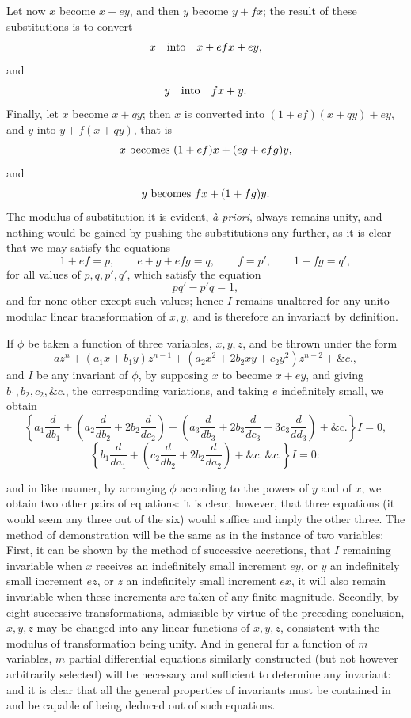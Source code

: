 \documentclass[11pt]{article}
\newcommand{\sourcepage}[1]{\marginpar{\scriptsize p.~#1}}
\begin{document}
{{Let now $x$ become $x+ey$, and then $y$ become $y+fx$; the result of these substitutions is to convert
\[
x\quad\hbox{into}\quad x+efx+ey,
\]
and
\[
y\quad\hbox{into}\quad fx+y.
\]
Finally, let $x$ become $x+qy$; then $x$ is converted into $(1+ef)(x+qy)+ey$, and $y$ into $y+f(x+qy)$, that is
\[
x\hbox{ becomes }(1+ef)x+(eg+efg)y,
\]
and
\[
y\hbox{ becomes }fx+(1+fg)y.
\]
The modulus of substitution it is evident, \emph{à priori}, always remains unity, and nothing would be gained by pushing the substitutions any further, as it is clear that we may satisfy the equations
\[
1+ef=p,
\qquad e+g+efg=q,
\qquad f=p',
\qquad 1+fg=q',
\]
for all values of $p,q,p',q'$, which satisfy the equation
\[
pq'-p'q=1,
\]
and for none other except such values; hence $I$ remains unaltered for any unito-modular linear transformation of $x,y$, and is therefore an invariant by definition.

If $\phi$ be taken a function of three variables, $x,y,z$, and be thrown under the form
\[
az^n+(a_1x+b_1y)z^{n-1}+(a_2x^2+2b_2xy+c_2y^2)z^{n-2}+\&c.,
\]
and $I$ be any invariant of $\phi$, by supposing $x$ to become $x+ey$, and giving $b_1,b_2,c_2,\&c.$, the corresponding variations, and taking $e$ indefinitely small, we obtain
\[
\left\{a_1\frac{d}{db_1}+\left(a_2\frac{d}{db_2}+2b_2\frac{d}{dc_2}\right)
+\left(a_3\frac{d}{db_3}+2b_3\frac{d}{dc_3}+3c_3\frac{d}{dd_3}\right)+\&c.\right\}I=0,
\]
\[
\left\{b_1\frac{d}{da_1}+\left(c_2\frac{d}{db_2}+2b_2\frac{d}{da_2}\right)+\&c.\ \&c.\right\}I=0:
\]

\sourcepage{356}
and in like manner, by arranging $\phi$ according to the powers of $y$ and of $x$, we obtain two other pairs of equations: it is clear, however, that three equations (it would seem any three out of the six) would suffice and imply the other three. The method of demonstration will be the same as in the instance of two variables: First, it can be shown by the method of successive accretions, that $I$ remaining invariable when $x$ receives an indefinitely small increment $ey$, or $y$ an indefinitely small increment $ez$, or $z$ an indefinitely small increment $ex$, it will also remain invariable when these increments are taken of any finite magnitude. Secondly, by eight successive transformations, admissible by virtue of the preceding conclusion, $x,y,z$ may be changed into any linear functions of $x,y,z$, consistent with the modulus of transformation being unity. And in general for a function of $m$ variables, $m$ partial differential equations similarly constructed (but not however arbitrarily selected) will be necessary and sufficient to determine any invariant: and it is clear that all the general properties of invariants must be contained in and be capable of being deduced out of such equations.

}}
\end{document}
